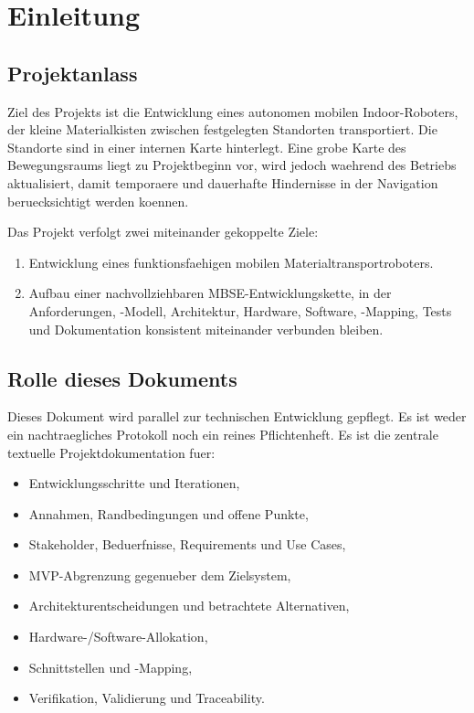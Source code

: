 \chapter{Einleitung}

\section{Projektanlass}

Ziel des Projekts ist die Entwicklung eines autonomen mobilen Indoor-Roboters, der kleine Materialkisten zwischen festgelegten Standorten transportiert. Die Standorte sind in einer internen Karte hinterlegt. Eine grobe Karte des Bewegungsraums liegt zu Projektbeginn vor, wird jedoch waehrend des Betriebs aktualisiert, damit temporaere und dauerhafte Hindernisse in der Navigation beruecksichtigt werden koennen.

Das Projekt verfolgt zwei miteinander gekoppelte Ziele:
\begin{enumerate}
  \item Entwicklung eines funktionsfaehigen mobilen Materialtransportroboters.
  \item Aufbau einer nachvollziehbaren MBSE-Entwicklungskette, in der Anforderungen, \sysml-Modell, Architektur, Hardware, Software, \ros-Mapping, Tests und Dokumentation konsistent miteinander verbunden bleiben.
\end{enumerate}

\section{Rolle dieses Dokuments}

Dieses Dokument wird parallel zur technischen Entwicklung gepflegt. Es ist weder ein nachtraegliches Protokoll noch ein reines Pflichtenheft. Es ist die zentrale textuelle Projektdokumentation fuer:
\begin{itemize}
  \item Entwicklungsschritte und Iterationen,
  \item Annahmen, Randbedingungen und offene Punkte,
  \item Stakeholder, Beduerfnisse, Requirements und Use Cases,
  \item MVP-Abgrenzung gegenueber dem Zielsystem,
  \item Architekturentscheidungen und betrachtete Alternativen,
  \item Hardware-/Software-Allokation,
  \item Schnittstellen und \ros-Mapping,
  \item Verifikation, Validierung und Traceability.
\end{itemize}

